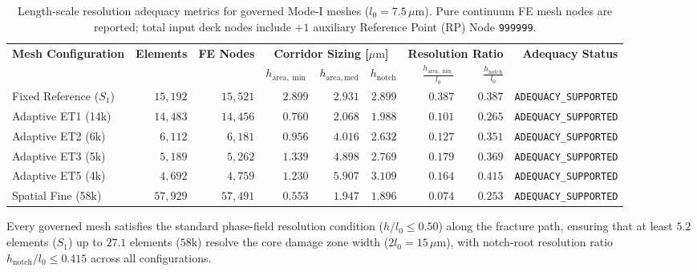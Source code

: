 \begin{table}[htbp]
\centering
\caption{Length-scale resolution adequacy metrics for governed Mode-I meshes ($l_0 = 7.5\,\mu\mathrm{m}$). Pure continuum FE mesh nodes are reported; total input deck nodes include $+1$ auxiliary Reference Point (RP) Node \texttt{999999}.}
\label{tab:governed_mesh_adequacy_thesis}
\small
\begin{tabular}{lrrrrrrrr}
\toprule
\textbf{Mesh Configuration} & \textbf{Elements} & \textbf{FE Nodes} & \multicolumn{3}{c}{\textbf{Corridor Sizing [$\mu\mathrm{m}$]}} & \multicolumn{2}{c}{\textbf{Resolution Ratio}} & \textbf{Adequacy Status} \\
\cmidrule(lr){4-6} \cmidrule(lr){7-8}
 & & & $h_{\mathrm{area},\min}$ & $h_{\mathrm{area},\mathrm{med}}$ & $h_{\mathrm{notch}}$ & $\frac{h_{\mathrm{area},\min}}{l_0}$ & $\frac{h_{\mathrm{notch}}}{l_0}$ & \\
\midrule
Fixed Reference ($S_1$) & $15{,}192$ & $15{,}521$ & $2.899$ & $2.931$ & $2.899$ & $\mathbf{0.387}$ & $\mathbf{0.387}$ & \texttt{ADEQUACY\_SUPPORTED} \\
Adaptive ET1 (14k) & $14{,}483$ & $14{,}456$ & $0.760$ & $2.068$ & $1.988$ & $\mathbf{0.101}$ & $\mathbf{0.265}$ & \texttt{ADEQUACY\_SUPPORTED} \\
Adaptive ET2 (6k) & $6{,}112$ & $6{,}181$ & $0.956$ & $4.016$ & $2.632$ & $\mathbf{0.127}$ & $\mathbf{0.351}$ & \texttt{ADEQUACY\_SUPPORTED} \\
Adaptive ET3 (5k) & $5{,}189$ & $5{,}262$ & $1.339$ & $4.898$ & $2.769$ & $\mathbf{0.179}$ & $\mathbf{0.369}$ & \texttt{ADEQUACY\_SUPPORTED} \\
Adaptive ET5 (4k) & $4{,}692$ & $4{,}759$ & $1.230$ & $5.907$ & $3.109$ & $\mathbf{0.164}$ & $\mathbf{0.415}$ & \texttt{ADEQUACY\_SUPPORTED} \\
Spatial Fine (58k) & $57{,}929$ & $57{,}491$ & $0.553$ & $1.947$ & $1.896$ & $\mathbf{0.074}$ & $\mathbf{0.253}$ & \texttt{ADEQUACY\_SUPPORTED} \\
\bottomrule
\end{tabular}
\end{table}

Every governed mesh satisfies the standard phase-field resolution condition ($h/l_0 \le 0.50$) along the fracture path, ensuring that at least $5.2$ elements ($S_1$) up to $27.1$ elements ($58\mathrm{k}$) resolve the core damage zone width ($2 l_0 = 15\,\mu\mathrm{m}$), with notch-root resolution ratio $h_{\mathrm{notch}}/l_0 \le 0.415$ across all configurations.

